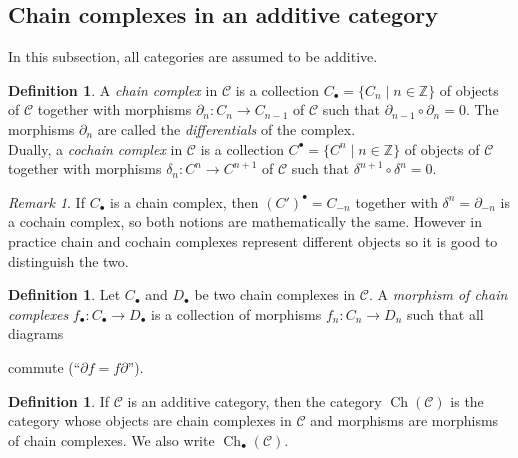 \documentclass{article}
\newcommand{\Z}{\mathbb{Z}}
\newcommand{\cat}{\mathcal{C}}
\DeclareMathOperator{\Ch}{Ch}
\theoremstyle{plain}
\theoremstyle{definition}
\newtheorem{definition}[theorem]{Definition}
\theoremstyle{remark}
\newtheorem*{remark}{Remark}
\begin{document}
\subsection{Chain complexes in an additive category}

In this subsection, all categories are assumed to be additive.

\begin{definition}
    A \emph{chain complex} in $\cat$ is a collection $C_\bullet = \{C_n \mid n\in \Z\}$ of objects of $\cat$ together with morphisms $\partial_n : C_n \to C_{n-1}$ of $\cat$ such that $\partial_{n-1} \circ \partial_n = 0$. The morphisms $\partial_n$ are called the \emph{differentials} of the complex. \\
    Dually, a \emph{cochain complex} in $\cat$ is a collection $C^\bullet = \{C^n \mid n\in \Z\}$ of objects of $\cat$ together with morphisms $\delta_n : C^n \to C^{n+1}$ of $\cat$ such that $\delta^{n+1} \circ \delta^n = 0$.
\end{definition}

\begin{remark}
    If $C_\bullet$ is a chain complex, then $(C')^\bullet = C_{-n}$ together with $\delta^n = \partial_{-n}$ is a cochain complex, so both notions are mathematically the same. However in practice chain and cochain complexes represent different objects so it is good to distinguish the two.
\end{remark}

\begin{definition}
    Let $C_\bullet$ and $D_\bullet$ be two chain complexes in $\cat$. A \emph{morphism of chain complexes} $f_\bullet : C_\bullet \to D_\bullet$ is a collection of morphisms $f_n : C_n \to D_n$ such that all diagrams
    \begin{center}
    \end{center}
    commute (``$\partial f = f\partial$'').
\end{definition}

\begin{definition}
    If $\cat$ is an additive category, then the category $\Ch(\cat)$ is the category whose objects are chain complexes in $\cat$ and morphisms are morphisms of chain complexes. We also write $\Ch_\bullet (\cat)$.
\end{definition}
\end{document}
